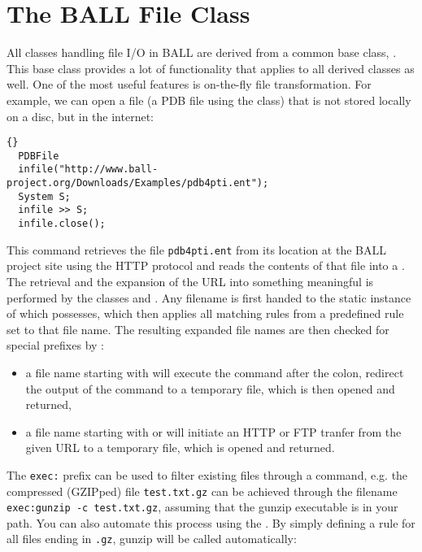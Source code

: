 \section{The BALL File Class}

All classes handling file I/O in BALL are derived from a common
base class, . This base class provides a lot of
functionality that applies to all derived classes as well.
One of the most useful features is on-the-fly file transformation.
For example, we can open a file (\eg a PDB file using the  
class) that is not stored locally on a disc, but in the internet:

\begin{lstlisting}{}
  PDBFile
  infile("http://www.ball-project.org/Downloads/Examples/pdb4pti.ent");
  System S;
  infile >> S;
  infile.close();
\end{lstlisting}

\noindent
This command retrieves the file {\tt pdb4pti.ent} from its location at the BALL
project site using the HTTP protocol and reads the contents of that file into a
. The retrieval and the expansion of the URL into something
meaningful is performed by the classes  and
. Any filename is first handed to the static instance of
 which  possesses, which then applies
all matching rules from a predefined rule set to that file name. The resulting
expanded file names are then checked for special prefixes by :
\begin{itemize}
  \item a file name starting with  will execute the command
        after the colon, redirect the output of the command to a temporary
        file, which is then opened and returned,

  \item a file name starting with  or  will
        initiate an HTTP or FTP tranfer from the given URL to a temporary file,
        which is opened and returned.
\end{itemize}

\noindent 
The {\tt exec:} prefix can be used to filter existing files through a command, 
e.g. the compressed (GZIPped) file {\tt test.txt.gz} can be achieved through
the filename {\tt exec:gunzip -c test.txt.gz}, assuming that the gunzip
executable is in your path. You can also automate this process using the
. By simply defining a rule for all files ending
in {\tt .gz}, gunzip will be called automatically:

